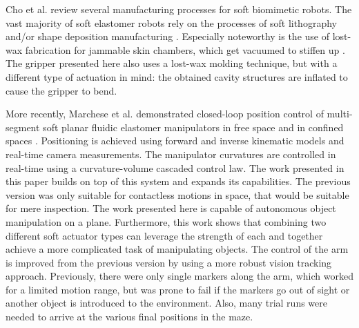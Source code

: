 Cho et al. \cite{cho2009review} review several manufacturing processes for soft biomimetic robots. 
The vast majority of soft elastomer robots rely on the processes of soft lithography \cite{xia1998soft} and/or shape deposition manufacturing \cite{cham2002fast}. 
Especially noteworthy is the use of lost-wax fabrication for jammable skin chambers, which get vacuumed to stiffen up \cite{steltz2009soft}. 
The gripper presented here also uses a lost-wax molding technique, but with a different type of actuation in mind: the obtained cavity structures are inflated to cause the gripper to bend.

More recently, Marchese et al. demonstrated closed-loop position control of multi-segment soft planar fluidic elastomer manipulators in free space \cite{marchese2014design} and in confined spaces \cite{marchese2014whole}. Positioning is achieved using forward and inverse kinematic models and real-time camera measurements. 
The manipulator curvatures are controlled in real-time using a curvature-volume cascaded control law.
The work presented in this paper builds on top of this system and expands its capabilities.
The previous version was only suitable for contactless motions in space, that would be suitable for mere inspection.
The work presented here is capable of autonomous object manipulation on a plane. 
Furthermore, this work shows that combining two different soft actuator types can leverage the strength of each and together achieve a more complicated task of manipulating objects.
The control of the arm is improved from the previous version by using a more robust vision tracking approach. 
Previously, there were only single markers along the arm, which worked for a limited motion range, but was prone to fail if the markers go out of sight or another object is introduced to the environment. 
Also, many trial runs were needed to arrive at the various final positions in the maze.

